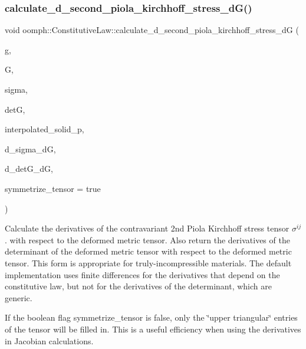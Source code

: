 \subsubsection{\texorpdfstring{calculate\+\_\+d\+\_\+second\+\_\+piola\+\_\+kirchhoff\+\_\+stress\+\_\+d\+G()}{calculate\_d\_second\_piola\_kirchhoff\_stress\_dG()}\hspace{0.1cm}{\footnotesize\ttfamily [2/3]}}
{\footnotesize\ttfamily void oomph\+::\+Constitutive\+Law\+::calculate\+\_\+d\+\_\+second\+\_\+piola\+\_\+kirchhoff\+\_\+stress\+\_\+dG (\begin{DoxyParamCaption}\item[{const \hyperlink{classoomph_1_1DenseMatrix}{Dense\+Matrix}$<$ double $>$ \&}]{g,  }\item[{const \hyperlink{classoomph_1_1DenseMatrix}{Dense\+Matrix}$<$ double $>$ \&}]{G,  }\item[{const \hyperlink{classoomph_1_1DenseMatrix}{Dense\+Matrix}$<$ double $>$ \&}]{sigma,  }\item[{const double \&}]{detG,  }\item[{const double \&}]{interpolated\+\_\+solid\+\_\+p,  }\item[{\hyperlink{classoomph_1_1RankFourTensor}{Rank\+Four\+Tensor}$<$ double $>$ \&}]{d\+\_\+sigma\+\_\+dG,  }\item[{\hyperlink{classoomph_1_1DenseMatrix}{Dense\+Matrix}$<$ double $>$ \&}]{d\+\_\+det\+G\+\_\+dG,  }\item[{const bool \&}]{symmetrize\+\_\+tensor = {\ttfamily true} }\end{DoxyParamCaption})\hspace{0.3cm}{\ttfamily [virtual]}}



Calculate the derivatives of the contravariant 2nd Piola Kirchhoff stress tensor $ \sigma^{ij}$. with respect to the deformed metric tensor. Also return the derivatives of the determinant of the deformed metric tensor with respect to the deformed metric tensor. This form is appropriate for truly-\/incompressible materials. The default implementation uses finite differences for the derivatives that depend on the constitutive law, but not for the derivatives of the determinant, which are generic. 

If the boolean flag symmetrize\+\_\+tensor is false, only the \char`\"{}upper  triangular\char`\"{} entries of the tensor will be filled in. This is a useful efficiency when using the derivatives in Jacobian calculations. 

